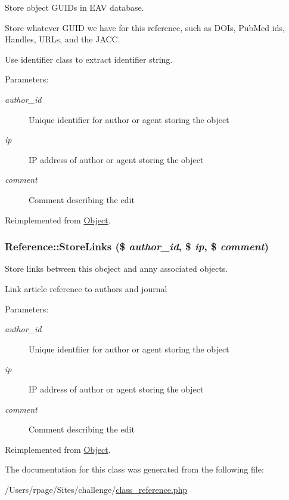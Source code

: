 Store object GUIDs in EAV database. 

Store whatever GUID we have for this reference, such as DOIs, PubMed ids, Handles, URLs, and the JACC.

Use identifier class to extract identifier string.

\begin{Desc}
\item[Parameters:]
\begin{description}
\item[{\em author\_\-id}]Unique identifier for author or agent storing the object \item[{\em ip}]IP address of author or agent storing the object \item[{\em comment}]Comment describing the edit \end{description}
\end{Desc}


Reimplemented from \hyperlink{class_object_dedb212835b4a878c89f7682ae11f772}{Object}.\hypertarget{class_reference_fdc9cb746064d8934a3cb8b4b7c66ca6}{
\subsubsection{\setlength{\rightskip}{0pt plus 5cm}Reference::StoreLinks (\$ {\em author\_\-id}, \/  \$ {\em ip}, \/  \$ {\em comment})}}
\label{class_reference_fdc9cb746064d8934a3cb8b4b7c66ca6}


Store links between this obeject and anny associated objects. 

Link article reference to authors and journal

\begin{Desc}
\item[Parameters:]
\begin{description}
\item[{\em author\_\-id}]Unique identfiier for author or agent storing the object \item[{\em ip}]IP address of author or agent storing the object \item[{\em comment}]Comment describing the edit \end{description}
\end{Desc}


Reimplemented from \hyperlink{class_object_b969bdfbdff62485da5de7e12f1ea68d}{Object}.

The documentation for this class was generated from the following file:\begin{CompactItemize}
\item 
/Users/rpage/Sites/challenge/\hyperlink{class__reference_8php}{class\_\-reference.php}\end{CompactItemize}
